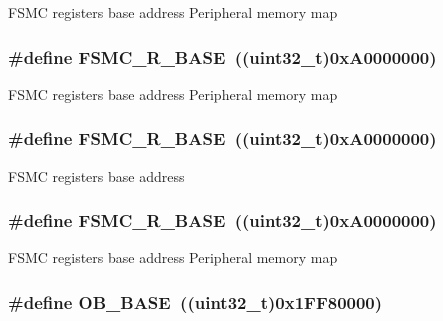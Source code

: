 F\-S\-M\-C registers base address Peripheral memory map \hypertarget{group___peripheral__memory__map_gaddf0e199dccba83272b20c9fb4d3aaed}{
\subsubsection[{F\-S\-M\-C\-\_\-\-R\-\_\-\-B\-A\-S\-E}]{\setlength{\rightskip}{0pt plus 5cm}\#define F\-S\-M\-C\-\_\-\-R\-\_\-\-B\-A\-S\-E~((uint32\-\_\-t)0x\-A0000000)}}\label{group___peripheral__memory__map_gaddf0e199dccba83272b20c9fb4d3aaed}
F\-S\-M\-C registers base address Peripheral memory map \hypertarget{group___peripheral__memory__map_gaddf0e199dccba83272b20c9fb4d3aaed}{
\subsubsection[{F\-S\-M\-C\-\_\-\-R\-\_\-\-B\-A\-S\-E}]{\setlength{\rightskip}{0pt plus 5cm}\#define F\-S\-M\-C\-\_\-\-R\-\_\-\-B\-A\-S\-E~((uint32\-\_\-t)0x\-A0000000)}}\label{group___peripheral__memory__map_gaddf0e199dccba83272b20c9fb4d3aaed}
F\-S\-M\-C registers base address \hypertarget{group___peripheral__memory__map_gaddf0e199dccba83272b20c9fb4d3aaed}{
\subsubsection[{F\-S\-M\-C\-\_\-\-R\-\_\-\-B\-A\-S\-E}]{\setlength{\rightskip}{0pt plus 5cm}\#define F\-S\-M\-C\-\_\-\-R\-\_\-\-B\-A\-S\-E~((uint32\-\_\-t)0x\-A0000000)}}\label{group___peripheral__memory__map_gaddf0e199dccba83272b20c9fb4d3aaed}
F\-S\-M\-C registers base address Peripheral memory map \hypertarget{group___peripheral__memory__map_gab5b5fb155f9ee15dfb6d757da1adc926}{
\subsubsection[{O\-B\-\_\-\-B\-A\-S\-E}]{\setlength{\rightskip}{0pt plus 5cm}\#define O\-B\-\_\-\-B\-A\-S\-E~((uint32\-\_\-t)0x1\-F\-F80000)}}\label{group___peripheral__memory__map_gab5b5fb155f9ee15dfb6d757da1adc926}
